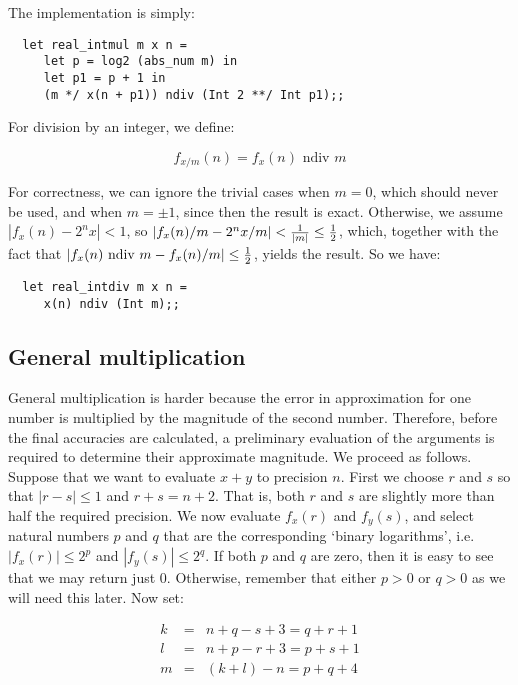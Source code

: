 \noindent The implementation is simply:

\begin{boxed}\begin{verbatim}
  let real_intmul m x n =
     let p = log2 (abs_num m) in
     let p1 = p + 1 in
     (m */ x(n + p1)) ndiv (Int 2 **/ Int p1);;
\end{verbatim}\end{boxed}

\noindent For division by an integer, we define:

$$ f_{x / m}(n) = f_x(n) \mbox{ ndiv } m $$

For correctness, we can ignore the trivial cases when  $m = 0$, which should
never be used, and when $m = \pm 1$, since then the result is exact. Otherwise,
we assume $|f_x(n) - 2^n x| < 1$, so $|f_x(n) / m - 2^n x / m| < {1 \over |m|}
\leq {1 \over 2}$, which, together with the fact that $|f_x(n) \mbox{ ndiv } m
- f_x(n) / m| \leq {1 \over 2}$, yields the result. So we have:

\begin{boxed}\begin{verbatim}
  let real_intdiv m x n =
     x(n) ndiv (Int m);;
\end{verbatim}\end{boxed}

\subsection{General multiplication}

General multiplication is harder because the error in approximation for one
number is multiplied by the magnitude of the second number. Therefore, before
the final accuracies are calculated, a preliminary evaluation of the arguments
is required to determine their approximate magnitude. We proceed as follows.
Suppose that we want to evaluate $x + y$ to precision $n$. First we choose $r$
and $s$ so that $|r - s| \leq 1$ and $r + s = n + 2$. That is, both $r$ and $s$
are slightly more than half the required precision. We now evaluate $f_x(r)$
and $f_y(s)$, and select natural numbers $p$ and $q$ that are the corresponding
`binary logarithms', i.e. $|f_x(r)| \leq 2^p$ and $|f_y(s)| \leq 2^q$. If both
$p$ and $q$ are zero, then it is easy to see that we may return just $0$.
Otherwise, remember that either $p > 0$ or $q > 0$ as we will need this later.
Now set:

\begin{eqnarray*}
k &= &n + q - s + 3 =  q + r + 1           \\
l &= &n + p - r + 3 =  p + s + 1           \\
m &= &(k + l) - n =  p + q + 4
\end{eqnarray*}

